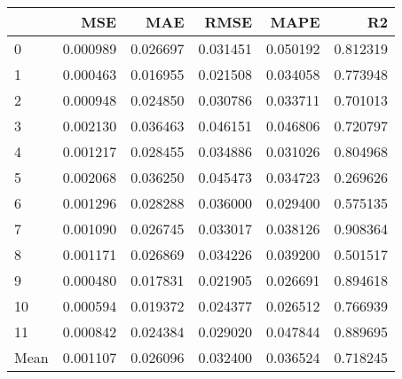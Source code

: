 \begin{tabular}{lrrrrr}
\toprule
 & MSE & MAE & RMSE & MAPE & R2 \\
\midrule
0 & 0.000989 & 0.026697 & 0.031451 & 0.050192 & 0.812319 \\
1 & 0.000463 & 0.016955 & 0.021508 & 0.034058 & 0.773948 \\
2 & 0.000948 & 0.024850 & 0.030786 & 0.033711 & 0.701013 \\
3 & 0.002130 & 0.036463 & 0.046151 & 0.046806 & 0.720797 \\
4 & 0.001217 & 0.028455 & 0.034886 & 0.031026 & 0.804968 \\
5 & 0.002068 & 0.036250 & 0.045473 & 0.034723 & 0.269626 \\
6 & 0.001296 & 0.028288 & 0.036000 & 0.029400 & 0.575135 \\
7 & 0.001090 & 0.026745 & 0.033017 & 0.038126 & 0.908364 \\
8 & 0.001171 & 0.026869 & 0.034226 & 0.039200 & 0.501517 \\
9 & 0.000480 & 0.017831 & 0.021905 & 0.026691 & 0.894618 \\
10 & 0.000594 & 0.019372 & 0.024377 & 0.026512 & 0.766939 \\
11 & 0.000842 & 0.024384 & 0.029020 & 0.047844 & 0.889695 \\
Mean & 0.001107 & 0.026096 & 0.032400 & 0.036524 & 0.718245 \\
\bottomrule
\end{tabular}
